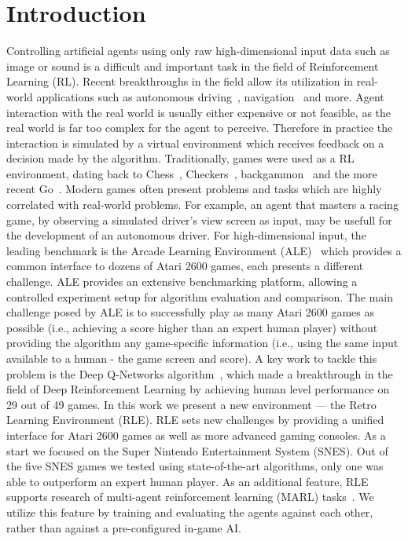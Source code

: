 \documentclass{article}
\begin{document}
\section{Introduction}
Controlling artificial agents using only raw high-dimensional input data such as image or sound is a difficult and important task in the field of Reinforcement Learning (RL). Recent breakthroughs in the field allow its utilization in real-world applications such as autonomous driving~\citep{shalev2016long}, navigation~\citep{bischoff2013hierarchical} and more.
Agent interaction with the real world is usually either expensive or not feasible, as the real world is far too complex for the agent to perceive. Therefore in practice the interaction is simulated by a virtual environment which receives feedback on a decision made by the algorithm. 
Traditionally, games were used as a RL environment, dating back to Chess~\citep{campbell2002deep}, Checkers~\citep{schaeffer1992world}, backgammon~\citep{tesauro1995temporal} and the more recent Go~\citep{silver2016mastering}. Modern games often present problems and tasks which are highly correlated with real-world problems. For example, an agent that masters a racing game, by observing a simulated driver's view screen as input, may be usefull for the development of an autonomous driver. For high-dimensional input, the leading benchmark is the Arcade Learning Environment (ALE)~\citep{bellemare13arcade} which provides a common interface to dozens of Atari 2600 games, each presents a different challenge. ALE provides an extensive benchmarking platform, allowing a controlled experiment setup for algorithm evaluation and comparison.
The main challenge posed by ALE is to successfully play as many Atari 2600 games as possible (i.e., achieving a score higher than an expert human player) without providing the algorithm any game-specific information (i.e., using the same input available to a human - the game screen and score).
A key work to tackle this problem is the Deep Q-Networks algorithm~\citep{mnih2015human}, which made a breakthrough in the field of Deep Reinforcement Learning by achieving human level performance on 29 out of 49 games. 
In this work we present a new environment --- the Retro Learning Environment (RLE). RLE sets new challenges by providing a unified interface for Atari 2600 games as well as more advanced gaming consoles. As a start we focused on the Super Nintendo Entertainment System (SNES). Out of the five SNES games we tested using state-of-the-art algorithms, only one was able to outperform an expert human player.
As an additional feature, RLE supports research of multi-agent reinforcement learning (MARL) tasks~\citep{bucsoniu2010multi}. We utilize this feature by training and evaluating the agents against each other, rather than against a pre-configured in-game AI.
\end{document}
